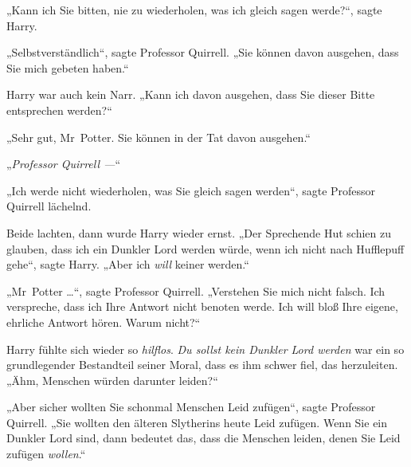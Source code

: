 „Kann ich Sie bitten, nie zu wiederholen, was ich gleich sagen werde?“, sagte Harry.

„Selbstverständlich“, sagte Professor Quirrell. „Sie können davon ausgehen, dass Sie mich gebeten haben.“

Harry war auch kein Narr. „Kann ich davon ausgehen, dass Sie dieser Bitte entsprechen werden?“

„Sehr gut, Mr~Potter. Sie können in der Tat davon ausgehen.“

„\emph{Professor Quirrell —}“

„Ich werde nicht wiederholen, was Sie gleich sagen werden“, sagte Professor Quirrell lächelnd.

Beide lachten, dann wurde Harry wieder ernst. „Der Sprechende Hut schien zu glauben, dass ich ein Dunkler Lord werden würde, wenn ich nicht nach Hufflepuff gehe“, sagte Harry. „Aber ich \emph{will} keiner werden.“

„Mr~Potter …“, sagte Professor Quirrell. „Verstehen Sie mich nicht falsch. Ich verspreche, dass ich Ihre Antwort nicht benoten werde. Ich will bloß Ihre eigene, ehrliche Antwort hören. Warum nicht?“

Harry fühlte sich wieder so \emph{hilflos}. \emph{Du sollst kein Dunkler Lord werden} war ein so grundlegender Bestandteil seiner Moral, dass es ihm schwer fiel, das herzuleiten. „Ähm, Menschen würden darunter leiden?“

„Aber sicher wollten Sie schonmal Menschen Leid zufügen“, sagte Professor Quirrell. „Sie wollten den älteren Slytherins heute Leid zufügen. Wenn Sie ein Dunkler Lord sind, dann bedeutet das, dass die Menschen leiden, denen Sie Leid zufügen \emph{wollen}.“

